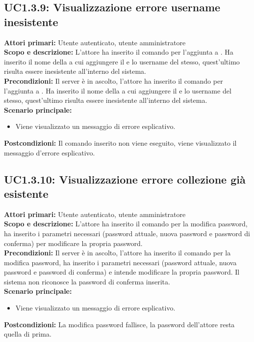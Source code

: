 \documentclass{scalatekids-article}
\begin{document}
\subsection{UC1.3.9: Visualizzazione errore username inesistente}
\textbf{Attori primari:} Utente autenticato, utente amministratore\\
\textbf{Scopo e descrizione:}
L'attore ha inserito il comando per l'aggiunta  a
. Ha inserito il nome della  a cui
aggiungere il  e lo username del  stesso, quest'ultimo risulta essere inesistente all'interno
del sistema.\\
\textbf{Precondizioni:} Il server è in ascolto, l'attore ha inserito il comando per l'aggiunta  a
. Ha inserito il nome della  a cui
aggiungere il  e lo username del
 stesso, quest'ultimo risulta essere inesistente all'interno del sistema.\\
\textbf{Scenario principale:}
\begin{itemize}
\item Viene visualizzato un messaggio di errore esplicativo.
\end{itemize}
\textbf{Postcondizioni:} Il comando inserito non viene eseguito, viene visualizzato il messaggio d'errore esplicativo.

\subsection{UC1.3.10: Visualizzazione errore collezione già esistente}

\textbf{Attori primari:} Utente autenticato, utente amministratore\\
\textbf{Scopo e descrizione:}
L'attore ha inserito il comando per la modifica password, ha inserito i parametri necessari (password attuale, nuova password e password di conferma) per modificare la propria password.\\
\textbf{Precondizioni:} Il server è in ascolto, l'attore ha inserito il comando per la modifica password, ha inserito i parametri necessari (password attuale, nuova password e password di conferma) e intende modificare la propria password. Il sistema non riconosce la password di conferma inserita.\\
\textbf{Scenario principale:}
\begin{itemize}
\item Viene visualizzato un messaggio di errore esplicativo.
\end{itemize}
\textbf{Postcondizioni:} La modifica password fallisce, la password dell'attore resta quella di prima.
\end{document}
